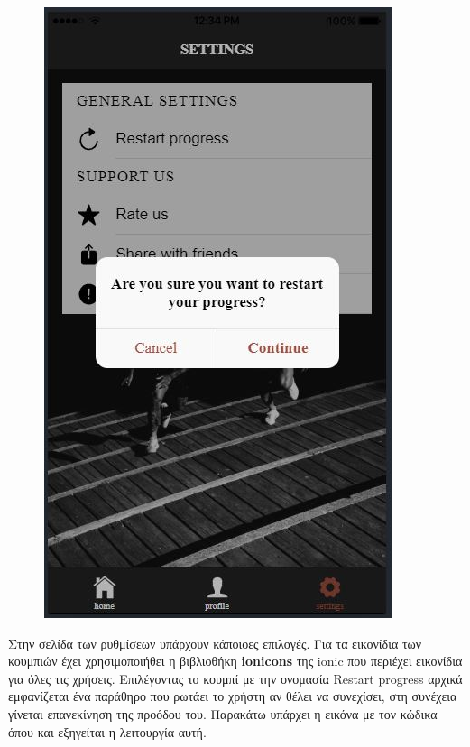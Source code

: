 \documentclass[a4paper,12pt]{article}
\begin{document}
\begin{figure}[!htb]
			  \includegraphics[width=\linewidth]{settings3}
			\endminipage\hfill
		\end{figure}
		\vspace*{1cm}

		Στην σελίδα των ρυθμίσεων υπάρχουν κάποιοες επιλογές. Για τα εικονίδια των κουμπιών έχει χρησιμοποιήθει η βιβλιοθήκη
		\textbf{ionicons} της ionic που περιέχει εικονίδια για όλες τις χρήσεις.
		Επιλέγοντας το κουμπί με την ονομασία Restart progress αρχικά εμφανίζεται ένα παράθηρο που ρωτάει το χρήστη αν θέλει να συνεχίσει, στη συνέχεια
		γίνεται επανεκίνηση της προόδου του. Παρακάτω υπάρχει η εικόνα με τον κώδικα όπου και εξηγείται η λειτουργία αυτή. 
		\clearpage
\end{document}
